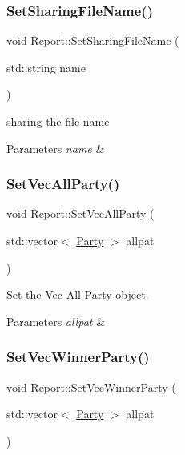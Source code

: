 \subsubsection{\texorpdfstring{Set\+Sharing\+File\+Name()}{SetSharingFileName()}}
{\footnotesize\ttfamily void Report\+::\+Set\+Sharing\+File\+Name (\begin{DoxyParamCaption}\item[{std\+::string}]{name }\end{DoxyParamCaption})\hspace{0.3cm}{\ttfamily [inline]}}



sharing the file name 


\begin{DoxyParams}{Parameters}
{\em name} & \\
\hline
\end{DoxyParams}
\mbox{\label{classReport_a7bb4a631240a73a3cad94c13b15aa10c}} 
\subsubsection{\texorpdfstring{Set\+Vec\+All\+Party()}{SetVecAllParty()}}
{\footnotesize\ttfamily void Report\+::\+Set\+Vec\+All\+Party (\begin{DoxyParamCaption}\item[{std\+::vector$<$ \hyperlink{classParty}{Party} $>$}]{allpat }\end{DoxyParamCaption})\hspace{0.3cm}{\ttfamily [inline]}}



Set the Vec All \hyperlink{classParty}{Party} object. 


\begin{DoxyParams}{Parameters}
{\em allpat} & \\
\hline
\end{DoxyParams}
\mbox{\label{classReport_a6b6f72448fe80a4865eb90630ebff6d8}} 
\subsubsection{\texorpdfstring{Set\+Vec\+Winner\+Party()}{SetVecWinnerParty()}}
{\footnotesize\ttfamily void Report\+::\+Set\+Vec\+Winner\+Party (\begin{DoxyParamCaption}\item[{std\+::vector$<$ \hyperlink{classParty}{Party} $>$}]{allpat }\end{DoxyParamCaption})\hspace{0.3cm}{\ttfamily [inline]}}



